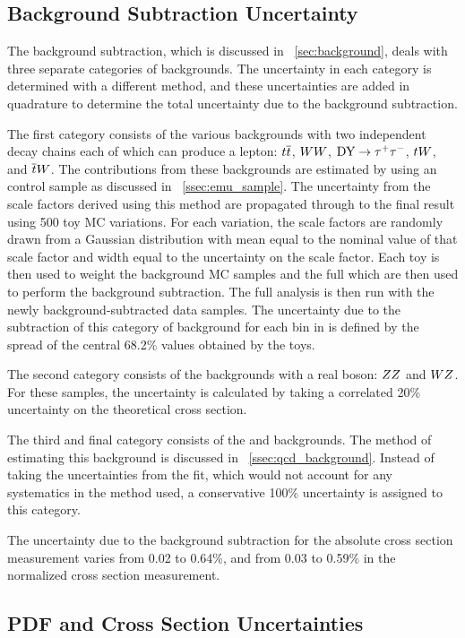 \subsection{Background Subtraction Uncertainty}
\label{ssec:background_subtraction_uncertainty}

The background subtraction, which is discussed in \SEC~\ref{sec:background},
deals with three separate categories of backgrounds. The uncertainty in
each category is determined with a different method, and these uncertainties
are added in quadrature to determine the total uncertainty due to the
background subtraction.

The first category consists of the various backgrounds with two independent
decay chains each of which can produce a lepton: $t\overline{t}$, $WW$,
$\text{DY} \to \tau^{+} \tau^{-}$, $tW$, and $\overline{t}W$. The contributions from these backgrounds
are estimated by using an \emu control sample as discussed in
\SEC~\ref{ssec:emu_sample}. The uncertainty from the scale factors derived
using this method are propagated through to the final result using 500 toy MC
variations. For each variation, the scale factors are randomly drawn from a
Gaussian distribution with mean equal to the nominal value of that scale factor
and width equal to the uncertainty on the scale factor. Each toy is then used
to weight the background MC samples and the full which are then used to perform
the background subtraction. The full analysis is then run with the newly
background-subtracted data samples. The uncertainty due to the subtraction of
this category of background for each bin in \phistar is defined by the spread
of the central 68.2\% values obtained by the toys.

The second category consists of the backgrounds with a real \Z boson: $ZZ$
and $WZ$. For these samples, the uncertainty is calculated by taking a
correlated 20\% uncertainty on the theoretical cross section.

The third and final category consists of the \QCDjets and \wjets
backgrounds. The method of estimating this background is discussed in
\SEC~\ref{ssec:qcd_background}. Instead of taking the uncertainties from the
fit, which would not account for any systematics in the method used, a
conservative 100\% uncertainty is assigned to this category.

The uncertainty due to the background subtraction for the absolute cross
section measurement varies from 0.02 to 0.64\%, and from 0.03 to 0.59\% in the
normalized cross section measurement.

\subsection{PDF and Cross Section Uncertainties}
\label{ssec:pdf_uncertainties}

